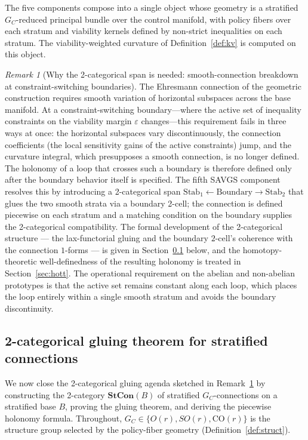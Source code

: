 \documentclass[11pt,a4paper]{article}
\theoremstyle{plain}
\theoremstyle{definition}
\theoremstyle{remark}
\newtheorem{remark}[theorem]{Remark}
\newcommand{\CO}{\mathrm{CO}}
\newcommand{\Stab}{\mathrm{Stab}}
\begin{document}
The five components compose into a single object whose geometry is a
stratified $G_C$-reduced principal bundle over the control manifold, with
policy fibers over each stratum and viability kernels defined by
non-strict inequalities on each stratum. The viability-weighted
curvature of Definition~\ref{def:kv} is computed on this
object.

\begin{remark}[Why the 2-categorical span is needed: smooth-connection
breakdown at constraint-switching boundaries]
\label{rem:2cat-span}
The Ehresmann connection of the geometric construction requires
smooth variation of horizontal subspaces across the base manifold.
At a constraint-switching boundary---where the active set of
inequality constraints on the viability margin $\varepsilon$
changes---this requirement fails in three ways at once: the
horizontal subspaces vary discontinuously, the connection
coefficients (the local sensitivity gains of the active constraints)
jump, and the curvature integral, which presupposes a smooth
connection, is no longer defined. The holonomy of a loop that
crosses such a boundary is therefore defined only after the
boundary behavior itself is specified. The fifth SAVGS component
resolves this by introducing a 2-categorical span
$\Stab_1\leftarrow\mathrm{Boundary}\rightarrow\Stab_2$ that glues the
two smooth strata via a boundary 2-cell; the connection is defined
piecewise on each stratum and a matching condition on the boundary
supplies the 2-categorical compatibility. The formal development of
the 2-categorical structure --- the lax-functorial gluing and the
boundary $2$-cell's coherence with the connection $1$-forms --- is
given in Section~\ref{sec:2cat-gluing} below, and the
homotopy-theoretic well-definedness of the resulting holonomy is
treated in Section~\ref{sec:hott}. The operational requirement on the abelian and non-abelian
prototypes is that the active set
remains constant along each loop, which places the loop entirely
within a single smooth stratum and avoids the boundary discontinuity.
\end{remark}

\subsection{2-categorical gluing theorem for stratified connections}
\label{sec:2cat-gluing}

We now close the 2-categorical gluing agenda sketched in
Remark~\ref{rem:2cat-span} by constructing the 2-category
$\mathbf{StCon}(B)$ of stratified $G_C$-connections on a stratified base
$B$, proving the gluing theorem, and deriving the piecewise holonomy
formula. Throughout, $G_C \in \{O(r), SO(r), \CO(r)\}$ is the structure
group selected by the policy-fiber geometry (Definition~\ref{def:struct}).
\end{document}
